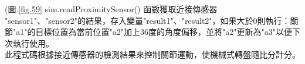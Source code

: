 (圖.\ref{fig.59} sim.readProximitySensor() 函數獲取近接傳感器 "sensor1"、"sensor2"的結果，存入變量"result1"、"result2"，如果大於0則執行：關節"a1"的目標位置為當前位置"a2"加上36度的角度偏移，並將"a2"更新為"a3"以便下次執行使用。\\
  此程式碼根據接近傳感器的檢測結果來控制關節運動，使機械式轉盤隨比分計分。\\
\renewcommand{\baselinestretch}{0} %